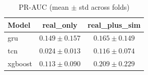 \begin{table}[htbp]
\centering
\caption{PR-AUC (mean $\pm$ std across folds)}
\label{tab:pr_auc}
\begin{tabular}{lcc}
\hline
Model & real_only & real_plus_sim \\
\hline
gru & $0.149 \pm 0.157$ & $0.165 \pm 0.149$ \\
tcn & $0.024 \pm 0.013$ & $0.116 \pm 0.074$ \\
xgboost & $0.113 \pm 0.090$ & $0.209 \pm 0.229$ \\
\hline
\end{tabular}
\end{table}